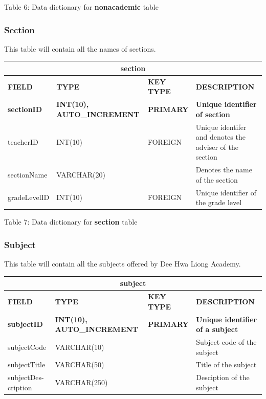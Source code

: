 \documentclass[11pt,a4paper,titlepage]{article}
\begin{document}
\vspace{.5cm}
\begin{center}
    Table 6: Data dictionary for \textbf{nonacademic} table
\end{center}


\subsubsection{Section}

This table will contain all the names of sections.

\vspace{1cm}
\begin{longtable}{ |p{2.5cm}|p{4.5cm}|p{2.5cm}|p{3cm}|  }
    \hline
    \multicolumn{4}{|c|}{\textbf{section}} \\
    \hline
    \textbf{FIELD}&\textbf{TYPE}&\textbf{KEY TYPE}&\textbf{DESCRIPTION}\\
    \hline
    \textbf{sectionID}   & \textbf{INT(10), AUTO\_INCREMENT} & \textbf{PRIMARY} & \textbf{Unique identifier of section}\\ \hline
    teacherID & INT(10) & FOREIGN & Unique identifer and denotes the adviser of the section \\ \hline
    sectionName & VARCHAR(20) & & Denotes the name of the section \\ \hline
    gradeLevelID & INT(10) & FOREIGN & Unique identifier of the grade level \\ \hline
\end{longtable}

\vspace{.5cm}
\begin{center}
    Table 7: Data dictionary for \textbf{section} table
\end{center}


\subsubsection{Subject}

This table will contain all the subjects offered by Dee Hwa Liong Academy.

\vspace{1cm}
\begin{longtable}{ |p{2.5cm}|p{4.5cm}|p{2.5cm}|p{3cm}|  }
    \hline
    \multicolumn{4}{|c|}{\textbf{subject}} \\
    \hline
    \textbf{FIELD}&\textbf{TYPE}&\textbf{KEY TYPE}&\textbf{DESCRIPTION}\\
    \hline
    \textbf{subjectID}   & \textbf{INT(10), AUTO\_INCREMENT} & \textbf{PRIMARY} & \textbf{Unique identifier of a subject}\\ \hline
    subjectCode & VARCHAR(10) & & Subject code of the subject \\ \hline
    subjectTitle & VARCHAR(50) & & Title of the subject \\ \hline
    subjectDes- cription & VARCHAR(250) & & Desciption of the subject \\ \hline
\end{longtable}
\end{document}
